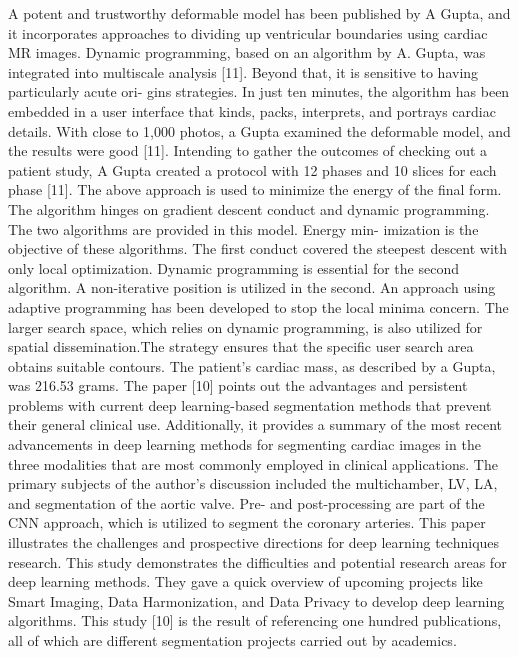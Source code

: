 \documentclass[runningheads]{llncs}
\begin{document}
A potent and trustworthy deformable model has been published by A Gupta, and it incorporates approaches to dividing up ventricular boundaries using cardiac MR images. Dynamic programming, based on an algorithm by A. Gupta, was integrated into multiscale analysis [11]. Beyond that, it is sensitive to having particularly acute ori- gins strategies. In just ten minutes, the algorithm has been embedded in a user interface that kinds, packs, interprets, and portrays cardiac details. With close to 1,000 photos, a Gupta examined the deformable model, and the results were good [11]. Intending to gather the outcomes of checking out a patient study, A Gupta created a protocol with 12 phases and 10 slices for each phase [11]. The above approach is used to minimize the energy of the final form. The algorithm hinges on gradient descent conduct and dynamic programming. The two algorithms are provided in this model. Energy min- imization is the objective of these algorithms. The first conduct covered the steepest descent with only local optimization. Dynamic programming is essential for the second algorithm. A non-iterative position is utilized in the second. An approach using adaptive programming has been developed to stop the local minima concern. The larger search space, which relies on dynamic programming, is also utilized for spatial dissemination.The strategy ensures that the specific user search area obtains suitable contours. The patient’s cardiac mass, as described by a Gupta, was 216.53 grams.
The paper [10] points out the advantages and persistent problems with current deep learning-based segmentation methods that prevent their general clinical use. Additionally, it provides a summary of the most recent advancements in deep learning methods for segmenting cardiac images in the three modalities that are most commonly employed in clinical applications. The primary subjects of the author's discussion included the multichamber, LV, LA, and segmentation of the aortic valve. Pre- and post-processing are part of the CNN approach, which is utilized to segment the coronary arteries. This paper illustrates the challenges and prospective directions for deep learning techniques research. This study demonstrates the difficulties and potential research areas for deep learning methods. They gave a quick overview of upcoming projects like Smart Imaging, Data Harmonization, and Data Privacy to develop deep learning algorithms. This study [10] is the result of referencing one hundred publications, all of which are different segmentation projects carried out by academics.
\end{document}
